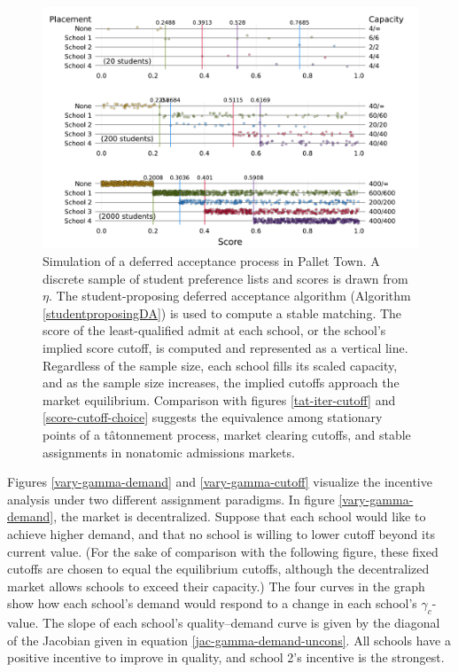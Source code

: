 \documentclass[12pt]{article}
\theoremstyle{definition}
\begin{document}
\begin{figure}
\begin{center}\includegraphics[width=\linewidth, ]{plots/score-DA-placement.pdf}\end{center}
\captionsetup{singlelinecheck=off}
    \caption[.]{Simulation of a deferred acceptance process in Pallet Town. A discrete sample of student preference lists and scores is drawn from $\eta$. The student-proposing deferred acceptance algorithm (Algorithm \ref{studentproposingDA}) is used to compute a stable matching. The score of the least-qualified admit at each school, or the school's implied score cutoff, is computed and represented as a vertical line. Regardless of the sample size, each school fills its scaled capacity, and as the sample size increases, the implied cutoffs approach the market equilibrium. Comparison with figures \ref{tat-iter-cutoff} and \ref{score-cutoff-choice} suggests the equivalence among stationary points of a t\^{a}tonnement process, market clearing cutoffs, and stable assignments in nonatomic admissions markets.}
\label{score-DA-placement}
\end{figure}


Figures \ref{vary-gamma-demand} and \ref{vary-gamma-cutoff} visualize the incentive analysis under two different assignment paradigms. In figure \ref{vary-gamma-demand}, the market is decentralized. Suppose that each school would like to achieve higher demand, and that no school is willing to lower cutoff beyond its current value. (For the sake of comparison with the following figure, these fixed cutoffs are chosen to equal the equilibrium cutoffs, although the decentralized market allows schools to exceed their capacity.) The four curves in the graph show how each school's demand would respond to a change in each school's $\gamma_c$-value. The slope of each school's quality--demand curve is given by the diagonal of the Jacobian given in equation \eqref{jac-gamma-demand-uncons}. All schools have a positive incentive to improve in quality, and school 2's incentive is the strongest.
\end{document}
